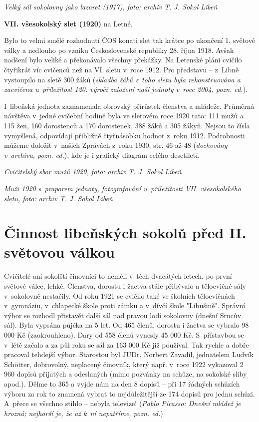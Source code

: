 \documentclass[a5paper, 12pt, twoside]{article}
\begin{document}

\textit{Velký sál sokolovny jako lazaret (1917), foto: archiv T. J. Sokol
Libeň}

\textbf{VII. všesokolský slet (1920)} na Letné.

Bylo to velmi smělé rozhodnutí ČOS konati slet tak krátce po ukončení 1.
světové války a nedlouho po vzniku Československé republiky 28. října
1918. Avšak nadšení bylo veliké a překonávalo všechny překážky. Na
Letenské pláni cvičilo čtyřikrát víc cvičenců než na VI. sletu v~roce
1912. Pro představu -- z~Libně vystoupilo na sletě 300 žáků
(\textit{skladba žáků z~toho sletu byla rekonstruována a zacvičena
u~příležitost 120. výročí založení naší jednoty v~roce 2004, pozn. ed.}).

I~libeňská jednota zaznamenala obrovský přírůstek členstva a mládeže.
Průměrná návštěva v~jedné cvičební hodině byla ve sletovém roce 1920
tato: 111 mužů a 115 žen, 160 dorostenců a 170 dorostenek, 388 žáků a
305 žákyň. Nejsou to čísla vymyšlená, odpovídají přibližně čtyřnásobku
hodnot z~roku 1912. Podrobnosti můžeme doložit v~našich Zprávách z~roku
1930, str. 46 až 48 (\textit{dochovány v~archivu, pozn. ed.}), kde je i
grafický diagram celého desetiletí.


\textit{Cvičitelský sbor mužů 1920, foto: archiv T. J. Sokol Libeň}


\textit{Muži 1920 s~praporem jednoty, fotografování u~příležitosti VII.
všesokolského sletu, foto: archiv T. J. Sokol Libeň}

\section{Činnost libeňských sokolů před II. světovou
válkou}

Cvičitelé ani sokolští činovníci to neměli v~těch dvacátých letech, po
první světové válce, lehké. Členstva, dorostu i žactva stále přibývalo a
tělocvičné sály v~sokolovně nestačily. Od roku 1921 se cvičilo také ve
školních tělocvičnách v~gymnáziu, v~chlapecké škole proti zámku a
v~dívčí škole "Libušině". Správní výbor se rozhodl přistavět další sál
nad pravou lodí sokolovny (dnešní Srncův sál). Byla vypsána půjčka na 5
let. Od 465 členů, dorostu i žactva se vybralo 98 000 Kč (zaokrouhleno).
Dary od 558 členů vynesly 45 000 Kč. S~přístavbou se v~létě začalo a za
půl roku se sál za 163 000 Kč již používal. Tak rychle a dobře pracoval
tehdejší výbor. Starostou byl JUDr. Norbert Zavadil, jednatelem Ludvík
Schötter, dobrovolný, neplacený činovník, který např. v~roce 1922
vykazoval 2 960 dopisů přijatých a odeslaných (mimo pozvánky na schůze,
na sokolské sliby apod.). Dělme to 365 a vyjde nám na den 8 dopisů --
při 17 řádných schůzích výboru za rok to znamená vybrat to
nejdůležitější ze 174 dopisů pro jednu schůzi. A~přece se všechno stihlo
-- nebyla televize! (\textit{Pablo Picasso: Dnešní mládež je hrozná;
nejhorší je, že už k~ní nepatříme, pozn. ed.})
\end{document}
